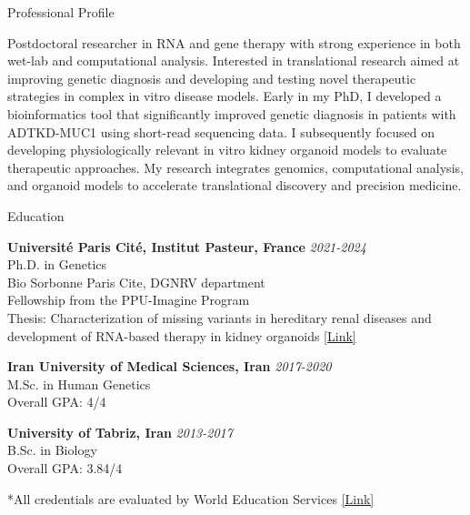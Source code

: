 \documentclass[
	11pt, %
]{resume} %
\begin{document}

\begin{rSection}{Professional Profile}

Postdoctoral researcher in RNA and gene therapy with strong experience in both wet-lab and computational analysis. Interested in translational research aimed at improving genetic diagnosis and developing and testing novel therapeutic strategies in complex in vitro disease models. Early in my PhD, I developed a bioinformatics tool that significantly improved genetic diagnosis in patients with ADTKD-MUC1 using short-read sequencing data. I subsequently focused on developing physiologically relevant in vitro kidney organoid models to evaluate therapeutic approaches. My research integrates genomics, computational analysis, and organoid models to accelerate translational discovery and precision medicine.

\end{rSection}


\begin{rSection}{Education}
	
	\textbf{Université Paris Cité, Institut Pasteur, France} \hfill \textit{2021-2024} \\ 
	Ph.D. in Genetics \\
	Bio Sorbonne Paris Cite, DGNRV department \\
	Fellowship from the PPU-Imagine Program \\
	Thesis: Characterization of missing variants in hereditary renal diseases and development of RNA-based therapy in kidney organoids \href{https://theses.hal.science/tel-05394188/}{[Link]}
	
	\textbf{Iran University of Medical Sciences, Iran} \hfill \textit{2017-2020} \\ 
	M.Sc. in Human Genetics  \\
	Overall GPA: 4/4
	
	\textbf{University of Tabriz, Iran} \hfill \textit{2013-2017} \\ 
	B.Sc. in Biology  \\
	Overall GPA: 3.84/4
	
	*All credentials are evaluated by World Education Services \href{https://www.credly.com/badges/866e14ca-d9e4-4c67-a419-0ade95cb1ddb/public_url}{[Link]}
	
\end{rSection}
\end{document}

